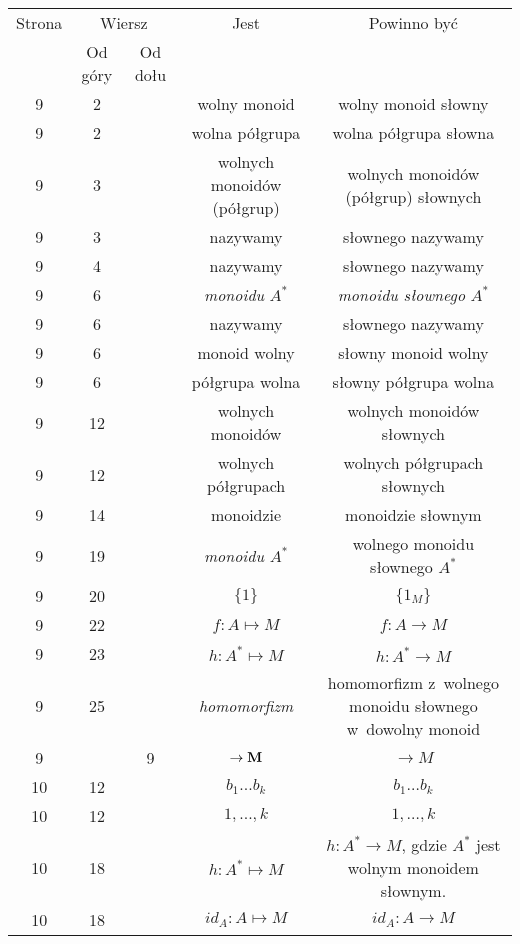 \documentclass[a4paper,11pt]{article}
\begin{document}
\begin{center}
  \begin{tabular}{|c|c|c|c|c|}
    \hline
    Strona & \multicolumn{2}{c|}{Wiersz} & Jest
                              & Powinno być \\ \cline{2-3}
    & Od góry & Od dołu & & \\
    \hline
    9  &  2 & & wolny monoid & wolny monoid słowny \\
    9  &  2 & & wolna półgrupa & wolna półgrupa słowna \\
    9  &  3 & & wolnych monoidów (półgrup)
                & wolnych monoidów (półgrup) słownych \\
    9  &  3 & & nazywamy & słownego nazywamy \\
    9  &  4 & & nazywamy & słownego nazywamy \\
    9  &  6 & & \textit{monoidu} $A^{ * }$
    & \textit{monoidu słownego} $A^{ * }$ \\
    9  &  6 & & nazywamy & słownego nazywamy \\
    9  &  6 & & monoid wolny & słowny monoid wolny \\
    9  &  6 & & półgrupa wolna & słowny półgrupa wolna \\
    9  & 12 & & wolnych monoidów & wolnych monoidów słownych \\
    9  & 12 & & wolnych półgrupach & wolnych półgrupach słownych \\
    9  & 14 & & monoidzie & monoidzie słownym \\
    9  & 19 & & \textit{monoidu $A^{ * }$}
    & wolnego monoidu słownego $A^{ * }$ \\
    9  & 20 & & $\{ 1 \}$ & $\{ 1_{ M } \}$ \\
    9  & 22 & & $f : A \mapsto M$ & $f : A \to M$ \\
    9  & 23 & & $h : A^{ * } \mapsto M$ & $h : A^{ * } \to M$ \\
    9  & 25 & & \textit{homomorfizm}
    & homomorfizm z~wolnego monoidu słownego w~dowolny monoid \\
    9  & &  9 & $\to \textrm{\textbf{M}}$ & $\to M$ \\
    10 & 12 & & $b_{ 1 } ... b_{ k }$ & $b_{ 1 } \ldots b_{ k }$ \\
    10 & 12 & & $1, ..., k$ & $1, \ldots, k$ \\
    10 & 18 & & $h : A^{ * } \mapsto M$
    & $h : A^{ * } \to M$, gdzie $A^{ * }$ jest wolnym monoidem słownym. \\
    10 & 18 & & $id_{ A } : A \mapsto M$ & $id_{ A } : A \to M$ \\

\end{tabular}
\end{center}
\end{document}
